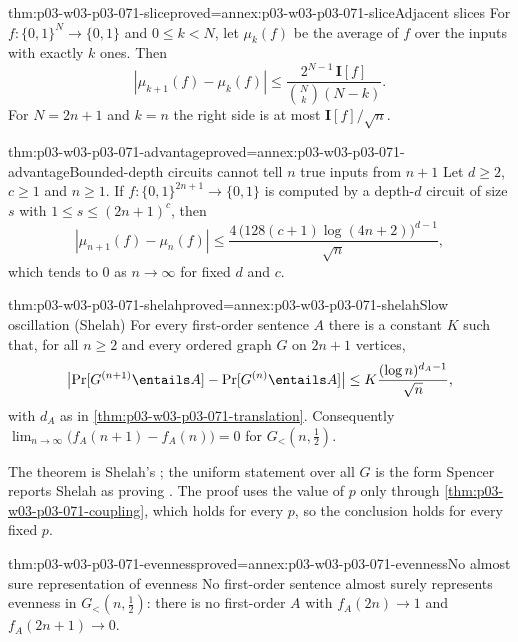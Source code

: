 \begin{hblemma}{thm:p03-w03-p03-071-slice}{proved=annex:p03-w03-p03-071-slice}{Adjacent slices}
For \(f:\{0,1\}^N\to\{0,1\}\) and \(0\leq k<N\), let \(\mu_k(f)\) be the
average of \(f\) over the inputs with exactly \(k\) ones.  Then
\[
  |\mu_{k+1}(f)-\mu_k(f)|\leq\frac{2^{N-1}\,\mathbf I[f]}{\binom Nk(N-k)} .
\]
For \(N=2n+1\) and \(k=n\) the right side is at most
\(\mathbf I[f]/\sqrt n\).
\end{hblemma}

\begin{hbcorollary}{thm:p03-w03-p03-071-advantage}{proved=annex:p03-w03-p03-071-advantage}{Bounded-depth circuits cannot tell \(n\) true inputs from \(n+1\)}
Let \(d\geq2\), \(c\geq1\) and \(n\geq1\).  If
\(f:\{0,1\}^{2n+1}\to\{0,1\}\) is computed by a depth-\(d\) circuit of size
\(s\) with \(1\leq s\leq(2n+1)^c\), then
\[
  |\mu_{n+1}(f)-\mu_n(f)|\leq
  \frac{4\,\bigl(128(c+1)\log(4n+2)\bigr)^{d-1}}{\sqrt n},
\]
which tends to \(0\) as \(n\to\infty\) for fixed \(d\) and \(c\).
\end{hbcorollary}

\begin{hbtheorem}{thm:p03-w03-p03-071-shelah}{proved=annex:p03-w03-p03-071-shelah}{Slow oscillation (Shelah)}
For every first-order sentence \(A\) there is a constant \(K\) such that, for
all \(n\geq2\) and every ordered graph \(G\) on \(2n+1\) vertices,
\[
  \bigl|\Pr[G^{(n+1)}\entails A]-\Pr[G^{(n)}\entails A]\bigr|
  \leq K\frac{(\log n)^{d_A-1}}{\sqrt n},
\]
with \(d_A\) as in \cref{thm:p03-w03-p03-071-translation}.  Consequently
\(\lim_{n\to\infty}\bigl(f_A(n+1)-f_A(n)\bigr)=0\) for \(G_<(n,\frac12)\).
\end{hbtheorem}

The theorem is Shelah's \cite[pp.~25, 28]{Spencer2007LogicRandomStructuresAuthor};
the uniform statement over all \(G\) is the form Spencer reports Shelah as
proving \cite[p.~25]{Spencer2007LogicRandomStructuresAuthor}.  The proof
uses the value of \(p\) only through \cref{thm:p03-w03-p03-071-coupling},
which holds for every \(p\), so the conclusion holds for every fixed \(p\).

\begin{hbcorollary}{thm:p03-w03-p03-071-evenness}{proved=annex:p03-w03-p03-071-evenness}{No almost sure representation of evenness}
No first-order sentence almost surely represents evenness in
\(G_<(n,\frac12)\): there is no first-order \(A\) with \(f_A(2n)\to1\) and
\(f_A(2n+1)\to0\).
\end{hbcorollary}

